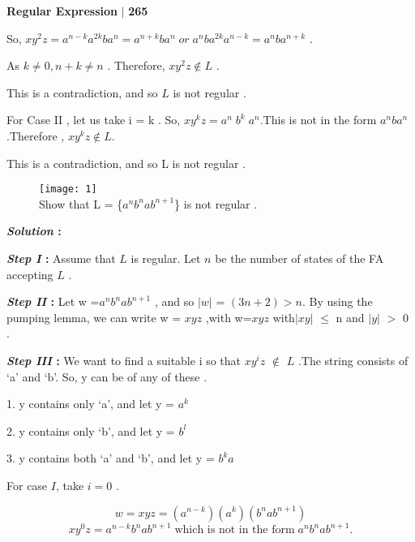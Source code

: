 \documentclass[10pt,a4paper]{article}
\begin{document}
\small

\begin{flushright}
  \textsf{\textbf{Regular Expression}} $|$ \textbf{\textsf{265}}
\end{flushright}

\begin{flushleft}
  So, $xy^{2}z = a^{n-k} a^{2k}b a^n = a^{n+k}b a^n \;or\;  a^n b a^{2k} a^{n-k}  = a^n b a^{n+k}$ .

As $k \neq 0 , n+k \neq n$ . Therefore, $xy^{2}z  \notin  L$ .

This is a contradiction, and so $L$ is not regular .

For Case II , let us take i = k . So, $xy^{k}z = a^{n}\; b^{k}\; a^{n}$.This is not in the form $a^{n} b a^{n}$.Therefore , $x y^k z \notin L$.

This is a contradiction, and so L is not regular .
\end{flushleft}

\begin{flushleft}
\begin{figure}[h]
  \texttt{[image: 1]}\\Show that L = \{$a^n b^n a b^{n+1}$\} is not regular .
\end{figure}
\end{flushleft}

\begin{flushleft}
  \textbf{\emph{Solution} :}

\textbf{\emph{Step I} :} Assume that $L$ is regular. Let $n$ be the number of states of the FA accepting $L$ .

\textbf{\emph{Step II} :} Let w =$a^n b^n a b^{n+1}$ , and so $| w |$ = $(3n + 2) > n$. By using the pumping lemma, we can write w = $xyz$ ,with w=$xyz$ with$|xy|$ $\leq$ n and $|y|$ $>$ 0 .

\textbf{\emph{Step III} :} We want to find a suitable i so that $xy^{i}z$ $\notin$ $L$ .The string consists of ‘a’ and ‘b’. So, y can be of any of these .

\end{flushleft}

1. y contains only ‘a’, and let y = $a^k$

2. y contains only ‘b’, and let y = $b^l$

3. y contains both ‘a’ and ‘b’, and let y = $b^{k}a$

For case $I$, take $i = 0$ .

$$ w = xyz = (a^{n-k})(a^k)(b^{n} a b^{n+1})$$
$$ xy^{0}z = a^{n-k} b^{n} ab^{n+1}\; \textrm{which is not in the form}\; a^{n} b^{n} ab^{n+1} .  $$
\end{document}
